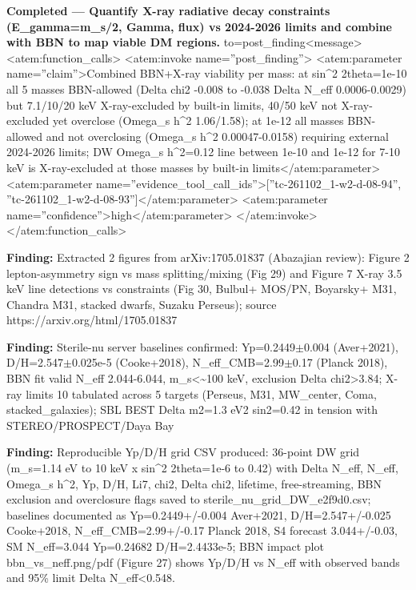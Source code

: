 \documentclass[11pt,a4paper]{article}
\begin{document}
\textbf{Completed --- Quantify X-ray radiative decay constraints (E\_gamma=m\_s/2, Gamma, flux) vs 2024-2026 limits and combine with BBN to map viable DM regions.} to=post\_finding\textless{}\textbar{}message\textbar{}\textgreater{}\textless{}atem:function\_calls\textgreater{} \textless{}atem:invoke name=''post\_finding''\textgreater{} \textless{}atem:parameter name=''claim''\textgreater{}Combined BBN+X-ray viability per mass: at sin\textasciicircum{}2 2theta=1e-10 all 5 masses BBN-allowed (Delta chi2 -0.008 to -0.038 Delta N\_eff 0.0006-0.0029) but 7.1/10/20 keV X-ray-excluded by built-in limits, 40/50 keV not X-ray-excluded yet overclose (Omega\_s h\textasciicircum{}2 1.06/1.58); at 1e-12 all masses BBN-allowed and not overclosing (Omega\_s h\textasciicircum{}2 0.00047-0.0158) requiring external 2024-2026 limits; DW Omega\_s h\textasciicircum{}2=0.12 line between 1e-10 and 1e-12 for 7-10 keV is X-ray-excluded at those masses by built-in limits\textless{}/atem:parameter\textgreater{} \textless{}atem:parameter name=''evidence\_tool\_call\_ids''\textgreater{}[''tc-261102\_1-w2-d-08-94'', ''tc-261102\_1-w2-d-08-93'']\textless{}/atem:parameter\textgreater{} \textless{}atem:parameter name=''confidence''\textgreater{}high\textless{}/atem:parameter\textgreater{} \textless{}/atem:invoke\textgreater{} \textless{}/atem:function\_calls\textgreater{}

\textbf{Finding:} Extracted 2 figures from arXiv:1705.01837 (Abazajian review): Figure 2 lepton-asymmetry sign vs mass splitting/mixing (Fig 29) and Figure 7 X-ray 3.5 keV line detections vs constraints (Fig 30, Bulbul+ MOS/PN, Boyarsky+ M31, Chandra M31, stacked dwarfs, Suzaku Perseus); source https://arxiv.org/html/1705.01837

\textbf{Finding:} Sterile-nu server baselines confirmed: Yp=0.2449$\pm$0.004 (Aver+2021), D/H=2.547$\pm$0.025e-5 (Cooke+2018), N\_eff\_CMB=2.99$\pm$0.17 (Planck 2018), BBN fit valid N\_eff 2.044-6.044, m\_s\textless{}\textasciitilde{}100 keV, exclusion Delta chi2\textgreater{}3.84; X-ray limits 10 tabulated across 5 targets (Perseus, M31, MW\_center, Coma, stacked\_galaxies); SBL BEST Delta m2=1.3 eV2 sin2=0.42 in tension with STEREO/PROSPECT/Daya Bay

\textbf{Finding:} Reproducible Yp/D/H grid CSV produced: 36-point DW grid (m\_s=1.14 eV to 10 keV x sin\textasciicircum{}2 2theta=1e-6 to 0.42) with Delta N\_eff, N\_eff, Omega\_s h\textasciicircum{}2, Yp, D/H, Li7, chi2, Delta chi2, lifetime, free-streaming, BBN exclusion and overclosure flags saved to sterile\_nu\_grid\_DW\_e2f9d0.csv; baselines documented as Yp=0.2449+/-0.004 Aver+2021, D/H=2.547+/-0.025 Cooke+2018, N\_eff\_CMB=2.99+/-0.17 Planck 2018, S4 forecast 3.044+/-0.03, SM N\_eff=3.044 Yp=0.24682 D/H=2.4433e-5; BBN impact plot bbn\_vs\_neff.png/pdf (Figure 27) shows Yp/D/H vs N\_eff with observed bands and 95\% limit Delta N\_eff\textless{}0.548.
\end{document}
